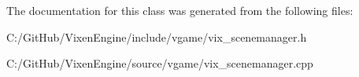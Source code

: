 The documentation for this class was generated from the following files\+:\begin{DoxyCompactItemize}
\item 
C\+:/\+Git\+Hub/\+Vixen\+Engine/include/vgame/vix\+\_\+scenemanager.\+h\item 
C\+:/\+Git\+Hub/\+Vixen\+Engine/source/vgame/vix\+\_\+scenemanager.\+cpp\end{DoxyCompactItemize}
